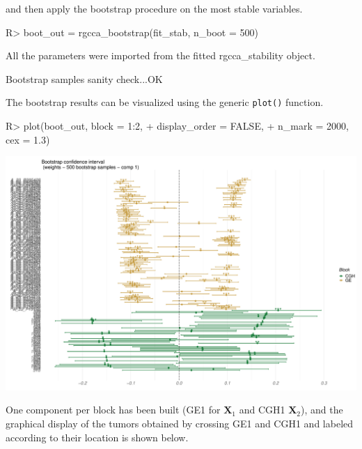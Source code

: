 \documentclass[
]{jss}
\begin{document}
and then apply the bootstrap procedure on the most stable variables.

\begin{CodeChunk}
\begin{CodeInput}
R> boot_out = rgcca_bootstrap(fit_stab, n_boot = 500)
\end{CodeInput}
\begin{CodeOutput}
All the parameters were imported from the fitted rgcca_stability object.
\end{CodeOutput}
\begin{CodeOutput}
Bootstrap samples sanity check...OK
\end{CodeOutput}
\end{CodeChunk}

The bootstrap results can be visualized using the generic
\texttt{plot()} function.

\footnotesize

\begin{CodeChunk}
\begin{CodeInput}
R> plot(boot_out, block = 1:2, 
+      display_order = FALSE, 
+      n_mark = 2000, cex = 1.3)
\end{CodeInput}


\begin{center}\includegraphics{RGCCA_files/figure-latex/unnamed-chunk-50-1} \end{center}

\end{CodeChunk}

\normalsize

One component per block has been built (GE1 for \(\mathbf{X}_1\) and
CGH1 \(\mathbf{X}_2\)), and the graphical display of the tumors obtained
by crossing GE1 and CGH1 and labeled according to their location is
shown below.
\end{document}
